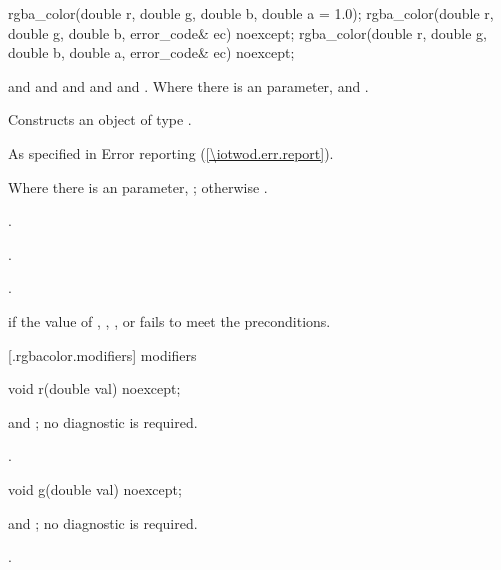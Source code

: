 \begin{itemdecl}
	rgba_color(double r, double g, double b, double a = 1.0);
  	rgba_color(double r, double g, double b, error_code& ec) noexcept;
  	rgba_color(double r, double g, double b, double a, error_code& ec) noexcept;
\end{itemdecl}
\begin{itemdescr}
	\pnum
	\requires
	 and  and  and  and  and . Where there is an  parameter,  and .
	
	\pnum
	\effects
	Constructs an object of type .

	\pnum
	\throws
	As specified in Error reporting (\ref{\iotwod.err.report}).
	
	\pnum
	\postconditions
	Where there is an  parameter, ; otherwise .
	
	.
	
	.
	
	.
	
	\pnum
	\errors
	 if the value of , , , or  fails to meet the preconditions.
	
\end{itemdescr}

 [\iotwod.rgbacolor.modifiers]{ modifiers}

%
%
\begin{itemdecl}
	void r(double val) noexcept;
\end{itemdecl}

\begin{itemdescr}
	\pnum
	\requires
	 and ; no diagnostic is required.
	
	\pnum
	\postconditions
	.
\end{itemdescr}

%
%
\begin{itemdecl}
	void g(double val) noexcept;
\end{itemdecl}
\begin{itemdescr}
	\pnum
	\requires
	 and ; no diagnostic is required.
	
	\pnum
	\postconditions
	.
\end{itemdescr}

